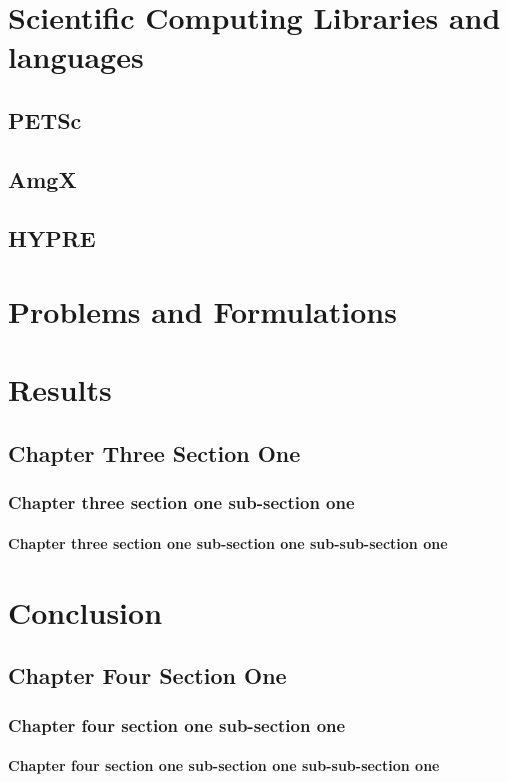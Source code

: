 \chapter{Scientific Computing Libraries and languages}
\section{PETSc}

\section{AmgX}

\section{HYPRE}





\chapter{Problems and Formulations}

\chapter{Results}
\section{Chapter Three Section One}
\subsection{Chapter three section one sub-section one}
\subsubsection{Chapter three section one sub-section one sub-sub-section one}


\chapter{Conclusion}
\section{Chapter Four Section One}
\subsection{Chapter four section one sub-section one}
\subsubsection{Chapter four section one sub-section one sub-sub-section one}

